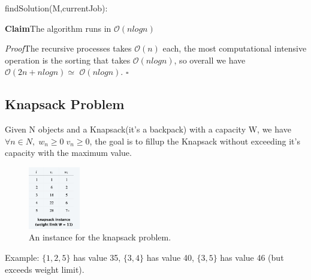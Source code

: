 \documentclass[11pt]{article}
\newenvironment{claim}[1]{\par\textbf{Claim}\space#1}{}
\newenvironment{proof}[1]{\par\textit{Proof}\space#1}{\hfill\ensuremath{\square}}
\begin{document}
\begin{algorithm}[H]
\SetAlgoLined
\small
{}
\BlankLine


\BlankLine

\caption{findSolution(M,currentJob):}
\end{algorithm}

\begin{claim}
The algorithm runs in $\mathcal{O}{(nlogn)}$
\end{claim}

\begin{proof}
The recursive processes takes $\mathcal{O}{(n)}$ each, the most computational intensive operation is the sorting that takes $\mathcal{O}{(nlogn)}$, so overall we have $\mathcal{O}{(2n + nlogn)} \simeq$ $\mathcal{O}{(nlogn)} .$  
\end{proof}

\subsection{Knapsack Problem}
Given N objects and a Knapsack(it's a backpack) with a capacity W, we have $\forall n \in N, \; w_{n} \geq 0 \; v_{n} \geq 0$, the goal is to fillup the Knapsack without exceeding it's capacity with the maximum value.

\begin{figure}[H]
		\centering
		\includegraphics[width=0.2\textwidth ]{knapsack}
		\caption{An instance for the knapsack problem.}
\end{figure}

Example: $\{ 1, 2, 5 \}$ has value 35,  $\{ 3, 4 \}$ has value 40, $\{ 3, 5 \}$ has value 46 (but exceeds weight limit).
\end{document}
